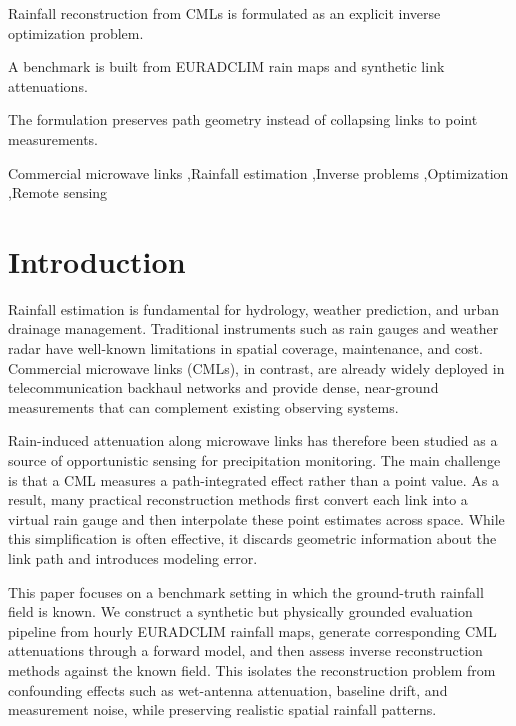 \documentclass[a4paper,fleqn]{cas-sc}
\newcommand{\notebox}[3]{%
  \begingroup
  \setlength{\fboxsep}{2pt}%
  \fcolorbox{#1}{#2}{\textsf{\footnotesize #3}}%
  \endgroup
}
\DeclareRobustCommand{\editnote}[1]{%
  \texorpdfstring{%
    \nobreak\hfill
    \mbox{\notebox{red!50!black}{red!10}{#1}}%
  }{}%
}
\begin{document}
\begin{highlights}
  \item Rainfall reconstruction from CMLs is formulated as an explicit inverse optimization problem.
  \item A benchmark is built from EURADCLIM rain maps and synthetic link attenuations.
  \item The formulation preserves path geometry instead of collapsing links to point measurements.
\end{highlights}

\begin{keywords}
  Commercial microwave links \sep Rainfall estimation \sep Inverse problems \sep Optimization \sep Remote sensing
\end{keywords}

\maketitle

\section{Introduction\editnote{GE:need complete rewrite}}
Rainfall estimation is fundamental for hydrology, weather prediction, and urban drainage management. Traditional instruments such as rain gauges and weather radar have well-known limitations in spatial coverage, maintenance, and cost. Commercial microwave links (CMLs), in contrast, are already widely deployed in telecommunication backhaul networks and provide dense, near-ground measurements that can complement existing observing systems.

Rain-induced attenuation along microwave links has therefore been studied as a source of opportunistic sensing for precipitation monitoring. The main challenge is that a CML measures a path-integrated effect rather than a point value. As a result, many practical reconstruction methods first convert each link into a virtual rain gauge and then interpolate these point estimates across space. While this simplification is often effective, it discards geometric information about the link path and introduces modeling error.

This paper focuses on a benchmark setting in which the ground-truth rainfall field is known. We construct a synthetic but physically grounded evaluation pipeline from hourly EURADCLIM rainfall maps, generate corresponding CML attenuations through a forward model, and then assess inverse reconstruction methods against the known field. This isolates the reconstruction problem from confounding effects such as wet-antenna attenuation, baseline drift, and measurement noise, while preserving realistic spatial rainfall patterns.
\end{document}
